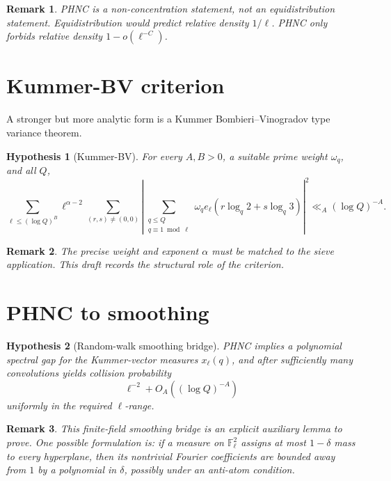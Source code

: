 \documentclass[11pt]{article}
\newtheorem{hypothesis}{Hypothesis}
\newtheorem{remark}{Remark}
\newcommand{\F}{\mathbb F}
\newcommand{\1}{\mathbf 1}
\begin{document}
\begin{remark}
PHNC is a non-concentration statement, not an equidistribution statement.  Equidistribution would predict relative density \(1/\ell\).  PHNC only forbids relative density \(1-o(\ell^{-C})\).
\end{remark}

\section{Kummer-BV criterion}

A stronger but more analytic form is a Kummer Bombieri--Vinogradov type variance theorem.

\begin{hypothesis}[Kummer-BV]\label{H:kbv}
For every \(A,B>0\), a suitable prime weight \(\omega_q\), and all \(Q\),
\[
\sum_{\ell\le(\log Q)^B}\ell^{\alpha-2}
\sum_{(r,s)\ne(0,0)}
\left|
\sum_{\substack{q\le Q\\ q\equiv1\bmod\ell}}
\omega_q e_\ell(r\log_q2+s\log_q3)
\right|^2
\ll_A(\log Q)^{-A}.
\]
\end{hypothesis}

\begin{remark}
The precise weight and exponent \(\alpha\) must be matched to the sieve application.  This draft records the structural role of the criterion.
\end{remark}

\section{PHNC to smoothing}

\begin{hypothesis}[Random-walk smoothing bridge]\label{H:krws}
PHNC implies a polynomial spectral gap for the Kummer-vector measures \(x_\ell(q)\), and after sufficiently many convolutions yields collision probability
\[
\ell^{-2}+O_A((\log Q)^{-A})
\]
uniformly in the required \(\ell\)-range.
\end{hypothesis}

\begin{remark}
This finite-field smoothing bridge is an explicit auxiliary lemma to prove.  One possible formulation is: if a measure on \(\F_\ell^2\) assigns at most \(1-\delta\) mass to every hyperplane, then its nontrivial Fourier coefficients are bounded away from \(1\) by a polynomial in \(\delta\), possibly under an anti-atom condition.
\end{remark}
\end{document}
